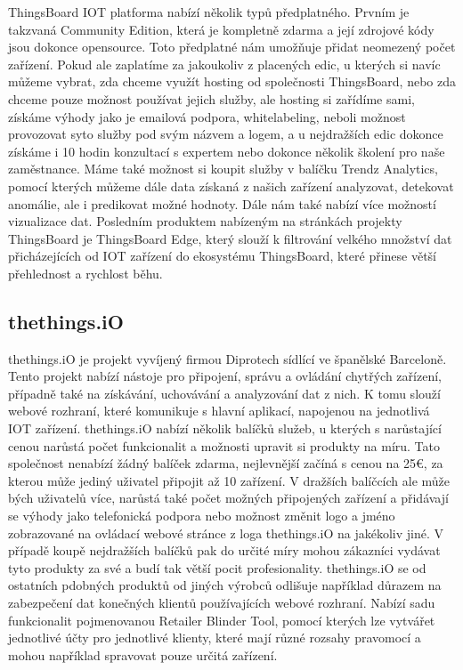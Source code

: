 ThingsBoard IOT platforma nabízí několik typů předplatného. Prvním je takzvaná Community Edition, která je kompletně zdarma a její zdrojové kódy jsou dokonce opensource. Toto předplatné nám umožňuje přidat neomezený počet zařízení. Pokud ale zaplatíme za jakoukoliv z placených edic, u kterých si navíc můžeme vybrat, zda chceme využít hosting od společnosti ThingsBoard, nebo zda chceme pouze možnost používat jejich služby, ale hosting si zařídíme sami, získáme výhody jako je emailová podpora, whitelabeling, neboli možnost provozovat syto služby pod svým názvem a logem, a u nejdražších edic dokonce získáme i 10 hodin konzultací s expertem nebo dokonce několik školení pro naše zaměstnance. Máme také možnost si koupit služby v balíčku Trendz Analytics, pomocí kterých můžeme dále data získaná z našich zařízení analyzovat, detekovat anomálie, ale i predikovat možné hodnoty. Dále nám také nabízí více možností vizualizace dat. Posledním produktem nabízeným na stránkách projekty ThingsBoard je ThingsBoard Edge, který slouží k filtrování velkého množství dat přicházejících od IOT zařízení do ekosystému ThingsBoard, které přinese větší přehlednost a rychlost běhu.

\subsection{thethings.iO}

thethings.iO je projekt vyvíjený firmou Diprotech sídlící ve španělské Barceloně. Tento projekt nabízí nástoje pro připojení, správu a ovládání chytřých zařízení, případně také na získávání, uchovávání a analyzování dat z nich. K tomu slouží webové rozhraní, které komunikuje s hlavní aplikací, napojenou na jednotlivá IOT zařízení. thethings.iO nabízí několik balíčků služeb, u kterých s narůstající cenou narůstá počet funkcionalit a možnosti upravit si produkty na míru. Tato společnost nenabízí žádný balíček zdarma, nejlevnější začíná s cenou na 25€, za kterou může jediný uživatel připojit až 10 zařízení. V dražších balíčcích ale může bých uživatelů více, narůstá také počet možných připojených zařízení a přidávají se výhody jako telefonická podpora nebo možnost změnit logo a jméno zobrazované na ovládací webové stránce z loga thethings.iO na jakékoliv jiné. V případě koupě nejdražších balíčků pak do určité míry mohou zákazníci vydávat tyto produkty za své a budí tak větší pocit profesionality. thethings.iO se od ostatních pdobných produktů od jiných výrobců odlišuje například důrazem na zabezpečení dat konečných klientů používajících webové rozhraní. Nabízí sadu funkcionalit pojmenovanou Retailer Blinder Tool, pomocí kterých lze vytvářet jednotlivé účty pro jednotlivé klienty, které mají různé rozsahy pravomocí a mohou například spravovat pouze určitá zařízení. 

